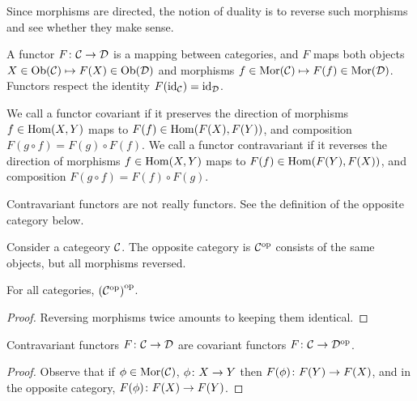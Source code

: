 \begin{remark}
    Since morphisms are directed,
    the notion of duality is to reverse such morphisms
    and see whether they make sense.
\end{remark}

\begin{definition}
    A functor \(F\colon\mathcal{C}\to\mathcal{D}\) is a mapping between categories,
    and \(F\) maps both objects \(X \in \operatorname{Ob}(\mathcal{C}) \mapsto F(X) \in \operatorname{Ob}(\mathcal{D})\)
    and morphisms \(f \in \operatorname{Mor}(\mathcal{C}) \mapsto F(f) \in \operatorname{Mor}(\mathcal{D})\).
    Functors respect the identity \(F(\operatorname{id}_{\mathcal{C}}) = \operatorname{id}_{\mathcal{D}}\).
\end{definition}

\begin{definition}
    We call a functor covariant if it preserves the direction of morphisms
    \(f \in \operatorname{Hom}(X,Y)\) maps to \(F(f) \in \operatorname{Hom}(F(X),F(Y))\),
    and composition \(F(g \circ f) = F(g) \circ F(f)\).
    We call a functor contravariant if it reverses the direction of morphisms
    \(f \in \operatorname{Hom}(X,Y)\) maps to \(F(f) \in \operatorname{Hom}(F(Y),F(X))\),
    and composition \(F(g \circ f) = F(f) \circ F(g)\).
\end{definition}
\begin{remark}
    Contravariant functors are not really functors.
    See the definition of the opposite category below.
\end{remark}

\begin{definition}
    Consider a categeory \(\mathcal{C}\).
    The opposite category is \(\mathcal{C}^\text{op}\)
    consists of the same objects, but all morphisms reversed.
\end{definition}
\begin{proposition}
    For all categories, \({(\mathcal{C}^\text{op})}^\text{op}\).
\end{proposition}
\begin{proof}
    Reversing morphisms twice amounts to keeping them identical.
\end{proof}

\begin{proposition}
    Contravariant functors \(F\colon\mathcal{C}\to\mathcal{D}\)
    are covariant functors \(F\colon\mathcal{C}\to\mathcal{D}^\text{op}\).
\end{proposition}
\begin{proof}
    Observe that if \(\phi \in \operatorname{Mor}(\mathcal{C})\), \(\phi\colon X\to Y\)
    then \(F(\phi)\colon F(Y)\to F(X)\),
    and in the opposite category, \(F(\phi)\colon F(X)\to F(Y)\).
\end{proof}

